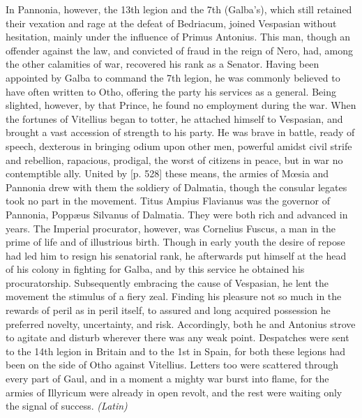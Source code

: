 In Pannonia, however, the 13th legion and the 7th (Galba's), which still retained their vexation and rage at the defeat of Bedriacum, joined Vespasian without hesitation, mainly under the influence of Primus Antonius. This man, though an offender against the law, and convicted of fraud in the reign of Nero, had, among the other calamities of war, recovered his rank as a Senator. Having been appointed by Galba to command the 7th legion, he was commonly believed to have often written to Otho, offering the party his services as a general. Being slighted, however, by that Prince, he found no employment during the war. When the fortunes of Vitellius began to totter, he attached himself to Vespasian, and brought a vast accession of strength to his party. He was brave in battle, ready of speech, dexterous in bringing odium upon other men, powerful amidst civil strife and rebellion, rapacious, prodigal, the worst of citizens in peace, but in war no contemptible ally. United by [p. 528] these means, the armies of Mœsia and Pannonia drew with them the soldiery of Dalmatia, though the consular legates took no part in the movement. Titus Ampius Flavianus was the governor of Pannonia, Poppæus Silvanus of Dalmatia. They were both rich and advanced in years. The Imperial procurator, however, was Cornelius Fuscus, a man in the prime of life and of illustrious birth. Though in early youth the desire of repose had led him to resign his senatorial rank, he afterwards put himself at the head of his colony in fighting for Galba, and by this service he obtained his procuratorship. Subsequently embracing the cause of Vespasian, he lent the movement the stimulus of a fiery zeal. Finding his pleasure not so much in the rewards of peril as in peril itself, to assured and long acquired possession he preferred novelty, uncertainty, and risk. Accordingly, both he and Antonius strove to agitate and disturb wherever there was any weak point. Despatches were sent to the 14th legion in Britain and to the 1st in Spain, for both these legions had been on the side of Otho against Vitellius. Letters too were scattered through every part of Gaul, and in a moment a mighty war burst into flame, for the armies of Illyricum were already in open revolt, and the rest were waiting only the signal of success. \emph{(Latin)}



